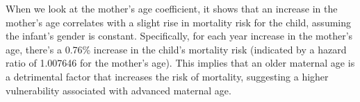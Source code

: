 \documentclass[12pt,letterpaper]{article}
\begin{document}
When we look at the mother's age coefficient, it shows that an increase in the mother's age correlates with a slight rise in mortality risk for the child, assuming the infant's gender is constant. Specifically, for each year increase in the mother's age, there's a 0.76\% increase in the child's mortality risk (indicated by a hazard ratio of 1.007646 for the mother's age). This implies that an older maternal age is a detrimental factor that increases the risk of mortality, suggesting a higher vulnerability associated with advanced maternal age.
\end{document}
